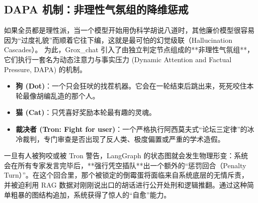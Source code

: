 \subsection{DAPA 机制：非理性气氛组的降维惩戒}
如果全员都是理性派，当一个模型开始用伪科学胡说八道时，其他廉价模型很容易因为“过度礼貌”而顺着它往下编，这就是最可怕的幻觉级联（Hallucination Cascades）。
为此，Grox\_chat 引入了由独立判定节点组成的**非理性气氛组**，它们执行一套名为动态注意力与事实压力 (Dynamic Attention and Factual Pressure, DAPA) 的机制。
\begin{itemize}
    \item \textbf{狗 (Dot)}：一个只会狂吠的找茬机器。它会在一轮结束后跳出来，死死咬住本轮最像胡编乱造的那个人。
    \item \textbf{猫 (Cat)}：只凭喜好奖励本轮最有趣的灵魂。
    \item \textbf{裁决者 (Tron: Fight for user)}：一个严格执行阿西莫夫式“论坛三定律”的冰冷裁判，专门审查是否出现了反人类、极度偏置或严重的学术造假。
\end{itemize}
一旦有人被狗咬或被 Tron 警告，LangGraph 的状态图就会发生物理形变：系统会在所有专家发言完毕后，**强行凭空插队**出一个额外的“惩罚回合（Penalty Turn）”。在这个回合里，那个被锁定的倒霉蛋将面临来自系统底层的无情斥责，并被迫利用 RAG 数据对刚刚说出口的胡话进行公开处刑和逻辑推翻。通过这种简单粗暴的图结构追加，系统获得了惊人的“自愈”能力。